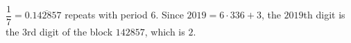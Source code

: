 $\dfrac17=0.\overline{142857}$ repeats with period $6$. Since $2019=6\cdot336+3$, the $2019$th digit is the $3$rd digit of the block $142857$, which is $\boxed{2}$.
